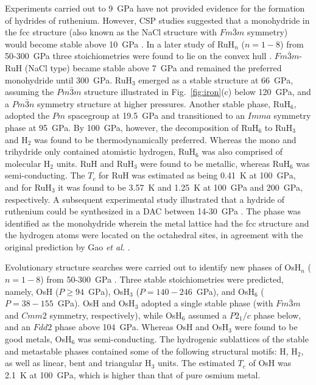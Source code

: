 \documentclass[12pt,letterpaper,oneside]{article}
\begin{document}
Experiments carried out to 9~GPa have not provided evidence for the formation of hydrides of ruthenium. However, CSP studies suggested that a monohydride in the fcc structure (also known as the NaCl structure with $Fm\bar{3}m$ symmetry) would become stable above 10~GPa \cite{Gao:2012}. In a later study of RuH$_{n}$ ($n = 1-8$) from 50-300~GPa three stoichiometries were found to lie on the convex hull \cite{Liu:2015c}. $Fm\bar{3}m$-RuH (NaCl type) became stable above 7~GPa and remained the preferred monohydride until 300~GPa. RuH$_3$ emerged as a stable structure at 66~GPa, assuming the $Pm\bar{3}m$ structure illustrated in Fig.\ \ref{fig:iron}(c) below 120~GPa, and a $Pm\bar{3}n$ symmetry structure at higher pressures. Another stable phase, RuH$_6$, adopted the $Pm$ spacegroup at 19.5~GPa and transitioned to an $Imma$ symmetry phase at 95~GPa. By 100~GPa, however, the decomposition of RuH$_6$ to RuH$_3$ and H$_2$ was found to be thermodynamically preferred. Whereas the mono and trihydride only contained atomistic hydrogen, RuH$_6$ was also comprised of  molecular H$_2$ units. RuH and RuH$_{3}$ were found to be metallic, whereas RuH$_{6}$ was semi-conducting. The $T_{c}$ for RuH was estimated as being 0.41~K at 100~GPa, and for RuH$_3$ it was found to be 3.57~K and 1.25~K at 100~GPa and 200~GPa, respectively. A subsequent experimental study illustrated that a hydride of ruthenium could be synthesized in a DAC between 14-30~GPa \cite{Kuzovnikov:2016}. The phase was identified as the monohydride wherein the metal lattice had the fcc structure and the hydrogen atoms were located on the octahedral sites, in agreement with the original prediction by Gao \emph{et al.} \cite{Gao:2012}.

Evolutionary structure searches were carried out to identify new phases of OsH$_n$ ($n=1-8$) from 50-300~GPa \cite{Liu:2015b}. Three stable stoichiometries were predicted, namely, OsH ($P\ge94$~GPa), OsH$_{3}$ ($P=140-246$~GPa), and OsH$_{6}$ ($P=38-155$~GPa). OsH and OsH$_{3}$ adopted a single stable phase (with $Fm\bar{3}m$ and $Cmm2$ symmetry, respectively), while OsH$_{6}$ assumed a $P2_1/c$ phase below, and an $Fdd2$ phase above 104~GPa. Whereas OsH and OsH$_3$ were found to be good metals, OsH$_6$ was semi-conducting.
The hydrogenic sublattices of the stable and metastable phases contained some of the following structural motifs: H, H$_2$, as well as linear, bent and triangular H$_3$ units. The estimated $T_{c}$ of OsH was 2.1~K at 100~GPa, which is higher than that of pure osmium metal.
\end{document}
